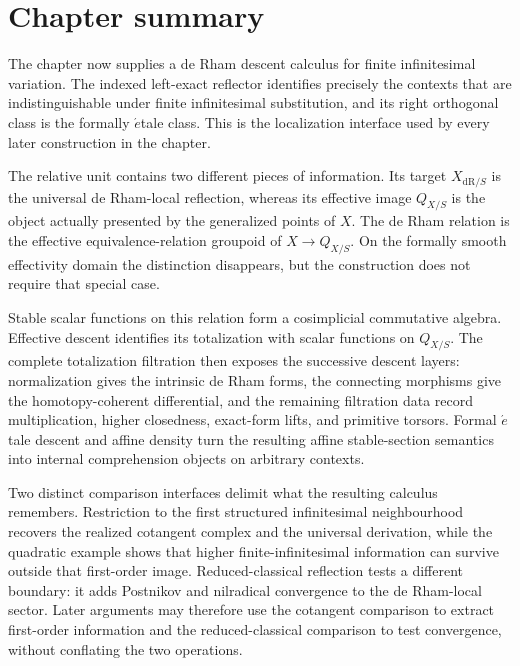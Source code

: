 \section{Chapter summary}
\label{sec:de-Rham-summary}

The chapter now supplies a de Rham descent calculus for finite infinitesimal
variation. The indexed left-exact reflector identifies precisely the contexts
that are indistinguishable under finite infinitesimal substitution, and its
right orthogonal class is the formally \(\acute{e}\)tale class. This is the
localization interface used by every later construction in the chapter.

The relative unit contains two different pieces of information. Its target
\(X_{\mathrm{dR}/S}\) is the universal de Rham-local reflection, whereas its
effective image \(Q_{X/S}\) is the object actually presented by the
generalized points of \(X\). The de Rham relation is the effective
equivalence-relation groupoid of \(X\to Q_{X/S}\). On the formally smooth
effectivity domain the distinction disappears, but the construction does not
require that special case.

Stable scalar functions on this relation form a cosimplicial commutative
algebra. Effective descent identifies its totalization with scalar functions
on \(Q_{X/S}\). The complete totalization filtration then exposes the
successive descent layers: normalization gives the intrinsic de Rham forms,
the connecting morphisms give the homotopy-coherent differential, and the
remaining filtration data record multiplication, higher closedness,
exact-form lifts, and primitive torsors. Formal \(\acute{e}\)tale descent
and affine density turn the resulting affine stable-section semantics into
internal comprehension objects on arbitrary contexts.

Two distinct comparison interfaces delimit what the resulting calculus
remembers. Restriction to the first structured infinitesimal neighbourhood
recovers the realized cotangent complex and the universal derivation, while the
quadratic example shows that higher finite-infinitesimal information can survive
outside that first-order image. Reduced-classical reflection tests a different
boundary: it adds Postnikov and nilradical convergence to the de Rham-local
sector. Later arguments may therefore use the cotangent comparison to extract
first-order information and the reduced-classical comparison to test convergence,
without conflating the two operations.
